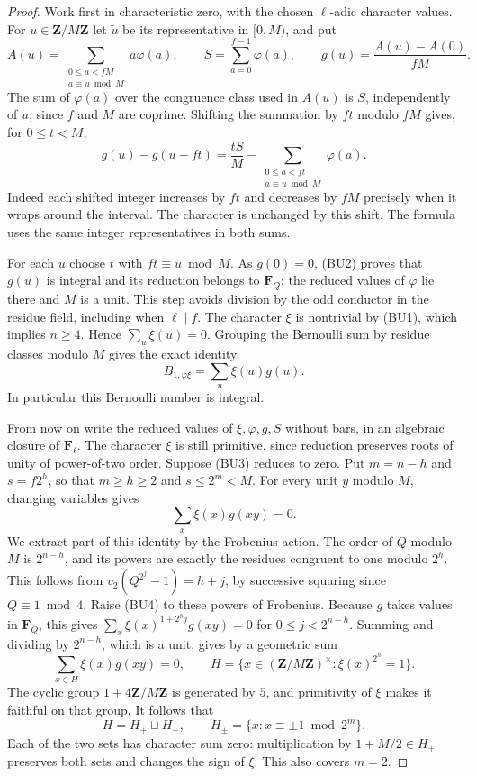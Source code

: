 \begin{proof}
Work first in characteristic zero, with the chosen
$\ell$-adic character values. For $u\in\mathbf Z/M\mathbf Z$
let $\tilde u$ be its representative in $[0,M)$, and put
\[
 A(u)=\sum_{\substack{0\le a<fM\\a\equiv u\bmod M}} a\varphi(a),
 \qquad S=\sum_{a=0}^{f-1}\varphi(a),\qquad
 g(u)=\frac{A(u)-A(0)}{fM}.
\]
The sum of $\varphi(a)$ over the congruence class used
in $A(u)$ is $S$, independently of $u$, since $f$ and $M$
are coprime. Shifting the summation by $ft$ modulo $fM$
gives, for $0\le t<M$,
\[
 g(u)-g(u-ft)=\frac{tS}{M}-
       \sum_{\substack{0\le a<ft\\a\equiv u\bmod M}}\varphi(a).
                                                               \tag{BU2}
\]
Indeed each shifted integer increases by $ft$ and decreases
by $fM$ precisely when it wraps around the interval.
The character is unchanged by this shift. The formula
uses the same integer representatives in both sums.

For each $u$ choose $t$ with $ft\equiv u\bmod M$.
As $g(0)=0$, (BU2) proves that $g(u)$ is integral and
its reduction belongs to $\mathbf F_Q$: the reduced
values of $\varphi$ lie there and $M$ is a unit.
This step avoids division by the odd conductor in the
residue field, including when $\ell\mid f$.
The character $\xi$ is nontrivial by (BU1), which implies
$n\ge4$. Hence $\sum_u\xi(u)=0$. Grouping the Bernoulli
sum by residue classes modulo $M$ gives the exact identity
\[
              B_{1,\varphi\xi}=\sum_u \xi(u)g(u).               \tag{BU3}
\]
In particular this Bernoulli number is integral.

From now on write the reduced values of $\xi,\varphi,g,S$
without bars, in an algebraic closure of $\mathbf F_\ell$.
The character $\xi$ is still primitive, since reduction
preserves roots of unity of power-of-two order.
Suppose (BU3) reduces to zero. Put $m=n-h$ and
$s=f2^h$, so that $m\ge h\ge2$ and $s\le2^m<M$.
For every unit $y$ modulo $M$, changing variables gives
\[
                         \sum_x \xi(x)g(xy)=0.                 \tag{BU4}
\]
We extract part of this identity by the Frobenius action.
The order of $Q$ modulo $M$ is $2^{n-h}$, and its powers
are exactly the residues congruent to one modulo $2^h$.
This follows from
$v_2(Q^{2^j}-1)=h+j$, by successive squaring since
$Q\equiv1\bmod4$. Raise (BU4) to these powers of Frobenius.
Because $g$ takes values in $\mathbf F_Q$, this gives
$\sum_x\xi(x)^{1+2^h j}g(xy)=0$ for
$0\le j<2^{n-h}$. Summing and dividing by $2^{n-h}$,
which is a unit, gives by a geometric sum
\[
 \sum_{x\in H}\xi(x)g(xy)=0,\qquad
 H=\{x\in(\mathbf Z/M\mathbf Z)^\times:
                                  \xi(x)^{2^h}=1\}.            \tag{BU5}
\]
The cyclic group $1+4\mathbf Z/M\mathbf Z$ is generated
by $5$, and primitivity of $\xi$ makes it faithful on
that group. It follows that
\[
 H=H_+\sqcup H_-,\qquad
 H_\pm=\{x:x\equiv\pm1\bmod 2^m\}.
\]
Each of the two sets has character sum zero: multiplication
by $1+M/2\in H_+$ preserves both sets and changes the sign
of $\xi$. This also covers $m=2$.


\end{proof}
